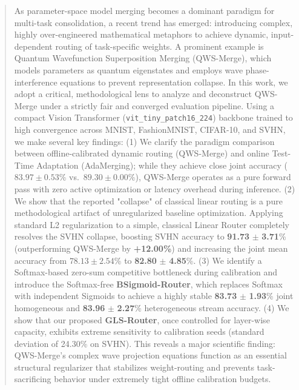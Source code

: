 \begin{abstract}
As parameter-space model merging becomes a dominant paradigm for multi-task consolidation, a recent trend has emerged: introducing complex, highly over-engineered mathematical metaphors to achieve dynamic, input-dependent routing of task-specific weights. A prominent example is Quantum Wavefunction Superposition Merging (QWS-Merge), which models parameters as quantum eigenstates and employs wave phase-interference equations to prevent representation collapse. In this work, we adopt a critical, methodological lens to analyze and deconstruct QWS-Merge under a strictly fair and converged evaluation pipeline. Using a compact Vision Transformer (\texttt{vit\_tiny\_patch16\_224}) backbone trained to high convergence across MNIST, FashionMNIST, CIFAR-10, and SVHN, we make several key findings: (1) We clarify the paradigm comparison between offline-calibrated dynamic routing (QWS-Merge) and online Test-Time Adaptation (AdaMerging); while they achieve close joint accuracy ($83.97 \pm 0.53$\% vs.\ $89.30 \pm 0.00$\%), QWS-Merge operates as a pure forward pass with zero active optimization or latency overhead during inference. (2) We show that the reported "collapse" of classical linear routing is a pure methodological artifact of unregularized baseline optimization. Applying standard L2 regularization to a simple, classical Linear Router completely resolves the SVHN collapse, boosting SVHN accuracy to \textbf{91.73} $\pm$ \textbf{3.71}\% (outperforming QWS-Merge by \textbf{+12.00\%}) and increasing the joint mean accuracy from $78.13 \pm 2.54$\% to \textbf{82.80} $\pm$ \textbf{4.85}\%. (3) We identify a Softmax-based zero-sum competitive bottleneck during calibration and introduce the Softmax-free \textbf{BSigmoid-Router}, which replaces Softmax with independent Sigmoids to achieve a highly stable \textbf{83.73} $\pm$ \textbf{1.93}\% joint homogeneous and \textbf{83.96} $\pm$ \textbf{2.27}\% heterogeneous stream accuracy. (4) We show that our proposed \textbf{GLS-Router}, once controlled for layer-wise capacity, exhibits extreme sensitivity to calibration seeds (standard deviation of 24.30\% on SVHN). This reveals a major scientific finding: QWS-Merge's complex wave projection equations function as an essential structural regularizer that stabilizes weight-routing and prevents task-sacrificing behavior under extremely tight offline calibration budgets.
\end{abstract}
